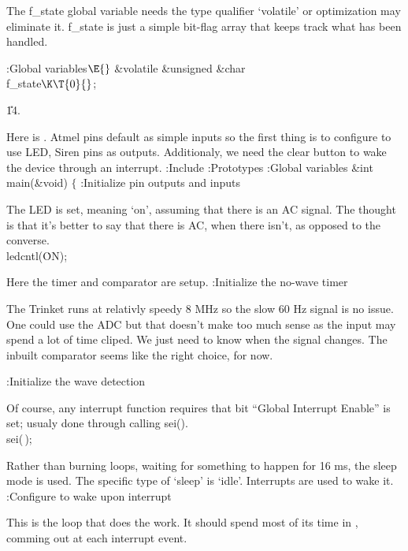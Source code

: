 The f\_state global variable needs the type qualifier `volatile' or
optimization may eliminate it.
f\_state is just a simple bit-flag array that keeps track what has been
handled.

\Y\B\4:Global variables\X${}\E{}$\6
\&{volatile} \&{unsigned} \&{char} \\{f\_state}${}\K\T{0}{}$;\par
\U14.\fi

Here is . Atmel pins default as simple inputs so the first thing
is to configure to use LED, Siren pins as outputs.
Additionaly, we need the clear button to wake the device through an interrupt.
\Y\B{}:Include\X\6
:Prototypes\X\6
:Global variables\X\6
\&{int} \\{main}(\&{void})\1\1 $\{$ :Initialize pin outputs and inputs\X\par
\fi

The LED is set, meaning `on', assuming that there is an AC signal.
The thought is that it's better to say that there is AC, when there isn't, as
opposed to the converse.
\Y\B{}\6
\\{ledcntl}(\.{ON});\par
\fi

Here the timer and comparator are setup.
\Y\B{}:Initialize the no-wave timer\X\par
\fi

The Trinket runs at relativly speedy 8 MHz so the slow 60 Hz signal is no
issue.
One could use the ADC but that doesn't make too much sense as the input may
spend a lot of time cliped.
We just need to know when the signal changes.
The inbuilt comparator seems like the right choice, for now.

\Y\B{}:Initialize the wave detection\X\par
\fi

Of course, any interrupt function requires that bit ``Global Interrupt Enable''
is set; usualy done through calling sei().
\Y\B\\{sei}(\,);\par
\fi

Rather than burning loops, waiting for something to happen for 16 ms, the sleep
mode is used.
The specific type of `sleep' is `idle'.
Interrupts are used to wake it.
\Y\B{}:Configure to wake upon interrupt\X\par
\fi

This is the loop that does the work. It should spend most of its time in , comming out at each interrupt event.

